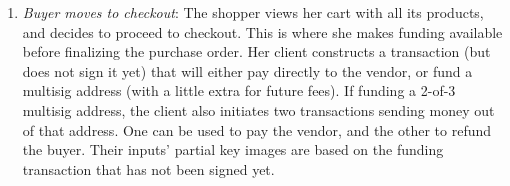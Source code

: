 \begin{enumerate}
\begin{enumerate}
        The view key is a hash of the buyer-vendor shared secret private key (not the aggregation private key, i.e. before {\tt premerge}), and the encryption key for communications between the buyer and vendor is a hash of the view key.\footnote{This same process would take place for 1-of-2 multisig, leaving out the moderator.}
        \item {\em Buyer moves to checkout}: The shopper views her cart with all its products, and decides to proceed to checkout. This is where she makes funding available before finalizing the purchase order. Her client constructs a transaction (but does not sign it yet) that will either pay directly to the vendor, or fund a multisig address (with a little extra for future fees). If funding a 2-of-3 multisig address, the client also initiates two transactions sending money out of that address. One can be used to pay the vendor, and the other to refund the buyer. Their inputs' partial key images are based on the funding transaction that has not been signed yet.\\


\end{enumerate}
\end{enumerate}
